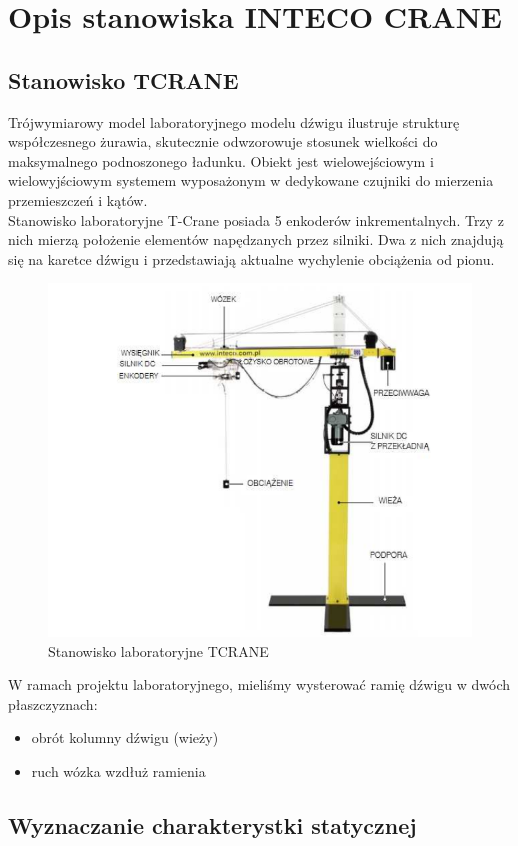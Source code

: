 \chapter{Opis stanowiska INTECO CRANE}
\label{inteco_stanowisko}

\section{Stanowisko TCRANE}
\label{inteco_stanowisko_TCRANE}
Trójwymiarowy model laboratoryjnego modelu dźwigu ilustruje strukturę współczesnego 
żurawia, skutecznie odwzorowuje stosunek wielkości do maksymalnego podnoszonego 
ładunku. Obiekt jest wielowejściowym i wielowyjściowym systemem wyposażonym w dedykowane
czujniki do mierzenia przemieszczeń i kątów.\\
\indent Stanowisko laboratoryjne T-Crane posiada 5 enkoderów inkrementalnych. Trzy z nich
mierzą położenie elementów napędzanych przez silniki. Dwa z nich znajdują się na karetce
dźwigu i przedstawiają aktualne wychylenie obciążenia od pionu.

\begin{figure}[H]
    \label{Opis::TCRANE::Stanowisko}
    \centering
    \includegraphics[scale=0.5]{./sections/inteco/images/tcrane.png}
    \caption{Stanowisko laboratoryjne TCRANE}
\end{figure}

W ramach projektu laboratoryjnego, mieliśmy wysterować ramię dźwigu w dwóch płaszczyznach:

\begin{itemize}
    \item obrót kolumny dźwigu (wieży)
    \item ruch wózka wzdłuż ramienia
\end{itemize}


\section{Wyznaczanie charakterystki statycznej}
\label{inteco_char_stat}
